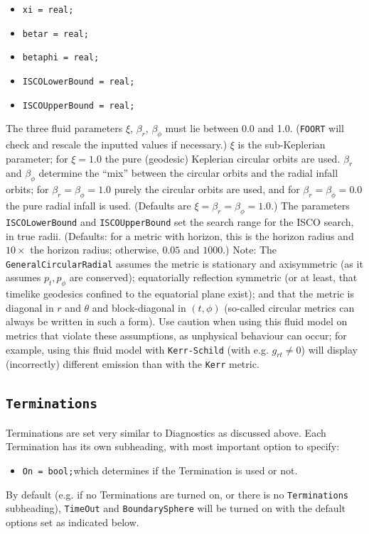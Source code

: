 \documentclass[11pt,a4paper]{article}
\newcommand{\code}[1]{{\tt #1}}
\begin{document}
\begin{itemize}
\begin{itemize}
\begin{itemize}
\begin{itemize}
\item \code{xi = real;}
\item \code{betar = real;}
\item \code{betaphi = real;}
\item \code{ISCOLowerBound = real;}
\item \code{ISCOUpperBound = real;}
\end{itemize}
The three  fluid parameters $\xi$, $\beta_r$, $\beta_\phi$ must lie between 0.0 and 1.0. (\code{FOORT} will check and rescale the inputted values if necessary.) $\xi$ is the sub-Keplerian parameter; for $\xi=1.0$ the pure (geodesic) Keplerian circular orbits are used. $\beta_r$ and $\beta_\phi$ determine the ``mix'' between the circular orbits and the radial infall orbits; for $\beta_r=\beta_\phi = 1.0$ purely the circular orbits are used, and for $\beta_r=\beta_\phi=0.0$ the pure radial infall is used. (Defaults are $\xi=\beta_r=\beta_\phi=1.0$.)\newline
The parameters \code{ISCOLowerBound} and \code{ISCOUpperBound} set the search range for the ISCO search, in true radii. (Defaults: for a metric with horizon, this is the horizon radius and $10\times$ the horizon radius; otherwise, $0.05$ and $1000$.)\newline
Note: The \code{GeneralCircularRadial} assumes the metric is stationary and axisymmetric (as it assumes $p_t,p_\phi$ are conserved); equatorially reflection symmetric (or at least, that timelike geodesics confined to the equatorial plane exist); and that the metric is diagonal in $r$ and $\theta$ and block-diagonal in $(t,\phi)$ (so-called circular metrics can always be written in such a form). Use caution when using this fluid model on metrics that violate these assumptions, as unphysical behaviour can occur; for example, using this fluid model with \code{Kerr-Schild} (with e.g. $g_{rt}\neq 0$) will display (incorrectly) different emission than with the \code{Kerr} metric.
\end{itemize}
\end{itemize}
\end{itemize}


\subsection{\code{Terminations}}
Terminations are set very similar to Diagnostics as discussed above. Each Termination has its own subheading, with most important option to specify:
\begin{itemize}
 \item \code{On = bool;}\newline which determines if the Termination is used or not.
\end{itemize}
By default (e.g. if no Terminations are turned on, or there is no \code{Terminations} subheading), \code{TimeOut} and \code{BoundarySphere} will be turned on with the default options set as indicated below.
\end{document}
